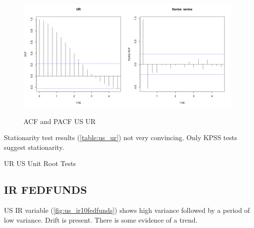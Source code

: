 \documentclass[10pt]{article}
\begin{document}
\begin{figure}[h!]
\centering
\includegraphics[width = 0.5\textwidth]{../acf/us_UR}\includegraphics[width = 0.5\textwidth]{../pacf/us_UR}
\caption{ACF and PACF US UR}
\label{fig:us_ur_acf}
\end{figure}

Stationarity test results (\autoref{table:us_ur}) not very convincing. Only KPSS tests suggest stationarity. 

\begin{table}[h!]
\centering
{}
\caption{UR US Unit Root Tests}
\label{table:us_ur}
\end{table}


\subsection{IR FEDFUNDS}

US IR variable (\autoref{fig:us_ir10fedfunds}) shows high variance followed by a period of low variance. Drift is present. There is some evidence of a trend.
\end{document}
